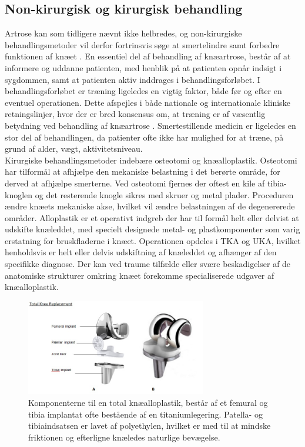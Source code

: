 \subsection{Non-kirurgisk og kirurgisk behandling}

Artrose kan som tidligere nævnt ikke helbredes, og non-kirurgiske behandlingsmetoder vil derfor fortrinsvis søge at smertelindre samt forbedre funktionen af knæet \citep{brostrom2012}. En essentiel del af behandling af knæartrose, består af at informere og uddanne patienten, med henblik på at patienten opnår indsigt i sygdommen, samt at patienten aktiv inddrages i behandlingsforløbet. I behandlingsforløbet er træning ligeledes en vigtig faktor, både før og efter en eventuel operationen. Dette afspejles i både nationale og internationale kliniske retningslinjer, hvor der er bred konsensus om, at træning er af væsentlig betydning ved behandling af knæartrose \citep{brostrom2012}. Smertestillende medicin er ligeledes en stor del af behandlingen, da patienter ofte ikke har mulighed for at træne, på grund af alder, vægt, aktivitetsniveau.\\

Kirurgiske behandlingsmetoder indebære osteotomi og knæalloplastik. Osteotomi har tilformål at afhjælpe den mekaniske belastning i det berørte område, for derved at afhjælpe smerterne. Ved osteotomi fjernes der oftest en kile af tibia-knoglen og det resterende knogle sikres med skruer og metal plader. Proceduren ændre knæets mekaniske akse, hvilket vil ændre belastningen af de degenererede områder. \citep{Osteotomi_og_TKA}
Alloplastik er et operativt indgreb der har til formål helt eller delvist at udskifte knæleddet, med specielt designede metal- og plastkomponenter som varig erstatning for bruskfladerne i knæet. Operationen opdeles i TKA og UKA, hvilket henholdsvis er helt eller delvis udskiftning af knæleddet og afhænger af den specifikke diagnose. Der kan ved traume tilfælde eller svære beskadigelser af de anatomiske strukturer omkring knæet forekomme specialiserede udgaver af knæalloplastik.

\begin{figure}[H] 
	\begin{center}
		\includegraphics[width=0.7\textwidth]{../figures/tka_implant}
	\end{center}
	\caption{Komponenterne til en total knæalloplastik, består af et femural og tibia implantat ofte bestående af en titaniumlegering. Patella- og tibiaindsatsen er lavet af polyethylen, hvilket er med til at mindske friktionen og efterligne knæledes naturlige bevægelse.\cite{1}} 
	\label{fig:tka_implant} 
\end{figure}

